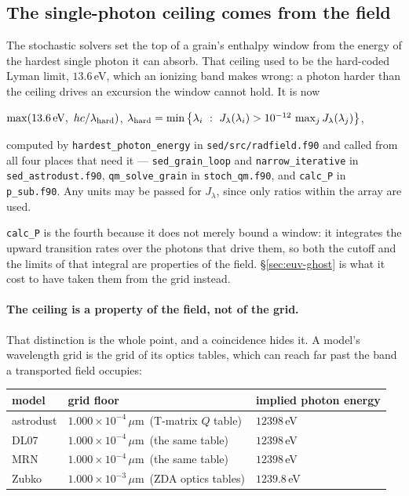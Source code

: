 \documentclass{my_memo}
\newcommand{\code}[1]{\texttt{#1}}
\newcommand{\um}{\ensuremath{\,\mu\mathrm{m}}}
\begin{document}
\subsection{The single-photon ceiling comes from the field}\label{sec:euv-ceiling}

The stochastic solvers set the top of a grain's enthalpy window from the energy
of the hardest single photon it can absorb. That ceiling used to be the
hard-coded Lyman limit, $13.6\,$eV, which an ionizing band makes wrong: a photon
harder than the ceiling drives an excursion the window cannot hold. It is now
\begin{center}
$\max\!\left(13.6\,\mathrm{eV},\ hc/\lambda_{\rm hard}\right)$, \qquad
$\lambda_{\rm hard} = \min\left\{\lambda_i\ :\ J_\lambda(\lambda_i) >
10^{-12}\,\max_j J_\lambda(\lambda_j)\right\}$,
\end{center}
computed by \code{hardest\_photon\_energy} in \code{sed/src/radfield.f90} and
called from all four places that need it --- \code{sed\_grain\_loop} and
\code{narrow\_iterative} in \code{sed\_astrodust.f90}, \code{qm\_solve\_grain}
in \code{stoch\_qm.f90}, and \code{calc\_P} in \code{p\_sub.f90}. Any units may
be passed for $J_\lambda$, since only ratios within the array are used.

\code{calc\_P} is the fourth because it does not merely bound a window: it
integrates the upward transition rates over the photons that drive them, so both
the cutoff and the limits of that integral are properties of the field.
\S\ref{sec:euv-ghost} is what it cost to have taken them from the grid instead.

\paragraph{The ceiling is a property of the field, not of the grid.} That
distinction is the whole point, and a coincidence hides it. A model's wavelength
grid is the grid of its optics tables, which can reach far past the band a
transported field occupies:

\begin{center}
\begin{tabular}{@{}lll@{}}
\toprule
model & grid floor & implied photon energy \\
\midrule
astrodust & $1.000\times10^{-4}$\um\ (T-matrix $Q$ table) & $12398\,$eV \\
DL07      & $1.000\times10^{-4}$\um\ (the same table)     & $12398\,$eV \\
MRN       & $1.000\times10^{-4}$\um\ (the same table)     & $12398\,$eV \\
Zubko     & $1.000\times10^{-3}$\um\ (ZDA optics tables)      & $1239.8\,$eV \\
\bottomrule
\end{tabular}
\end{center}
\end{document}
